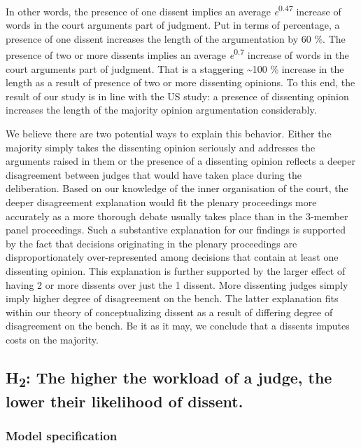 \documentclass[
  11pt,
]{article}
\begin{document}
In other words, the presence of one dissent implies an average
\emph{e}\textsuperscript{0.47} increase of words in the court arguments
part of judgment. Put in terms of percentage, a presence of one dissent
increases the length of the argumentation by 60 \%. The presence of two
or more dissents implies an average \emph{e}\textsuperscript{0.7}
increase of words in the court arguments part of judgment. That is a
staggering \textasciitilde100 \% increase in the length as a result of
presence of two or more dissenting opinions. To this end, the result of
our study is in line with the US study: a presence of dissenting opinion
increases the length of the majority opinion argumentation considerably.

We believe there are two potential ways to explain this behavior. Either
the majority simply takes the dissenting opinion seriously and addresses
the arguments raised in them or the presence of a dissenting opinion
reflects a deeper disagreement between judges that would have taken
place during the deliberation. Based on our knowledge of the inner
organisation of the court, the deeper disagreement explanation would fit
the plenary proceedings more accurately as a more thorough debate
usually takes place than in the 3-member panel proceedings. Such a
substantive explanation for our findings is supported by the fact that
decisions originating in the plenary proceedings are disproportionately
over-represented among decisions that contain at least one dissenting
opinion. This explanation is further supported by the larger effect of
having 2 or more dissents over just the 1 dissent. More dissenting
judges simply imply higher degree of disagreement on the bench. The
latter explanation fits within our theory of conceptualizing dissent as
a result of differing degree of disagreement on the bench. Be it as it
may, we conclude that a dissents imputes costs on the majority.

\hypertarget{h2-the-higher-the-workload-of-a-judge-the-lower-their-likelihood-of-dissent.}{%
\subsection{\texorpdfstring{H\textsubscript{2}: The higher the workload
of a judge, the lower their likelihood of
dissent.}{H2: The higher the workload of a judge, the lower their likelihood of dissent.}}\label{h2-the-higher-the-workload-of-a-judge-the-lower-their-likelihood-of-dissent.}}

\hypertarget{model-specification-1}{%
\subsubsection{Model specification}\label{model-specification-1}}
\end{document}
